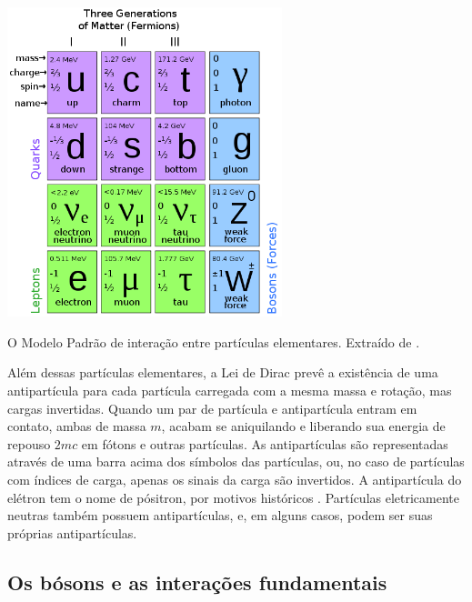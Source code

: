 \begin{table}[ht!]
\centering
\includegraphics[width=0.6\textwidth]{imagens/standart_model.png}
\caption[O Modelo Padrão de interação entre as partículas elementares]{
O Modelo Padrão de interação entre partículas elementares. Extraído de
\cite{tese_torres}.}
\label{tab:modelo_padrao}
\end{table}

Além dessas partículas elementares, a Lei de Dirac prevê a
existência de uma antipartícula para cada partícula carregada
com a mesma massa e rotação, mas cargas invertidas. 
Quando um par de partícula e antipartícula entram em contato,
ambas de massa $m$, acabam se aniquilando e liberando sua energia de repouso $2mc$ em fótons e outras
partículas. As antipartículas são representadas através de uma barra acima dos símbolos
das partículas, ou, no caso de partículas com índices de carga, 
apenas os sinais da carga são invertidos. 
A antipartícula do elétron tem o nome de pósitron, por motivos
históricos \cite{Intro_Standard,Intro_Nuclear}. Partículas 
eletricamente neutras também possuem antipartículas, e, em alguns casos,
podem ser suas próprias antipartículas.

\subsection{Os bósons e as interações fundamentais}
\label{ssec:bossoms}

